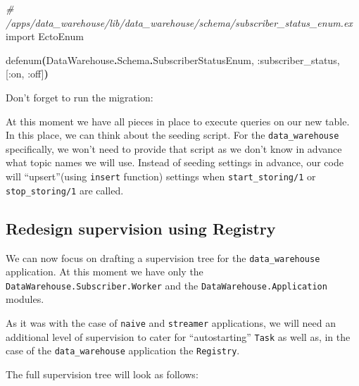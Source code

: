 \documentclass[
  oneside]{book}
\newenvironment{Shaded}{\begin{snugshade}}{\end{snugshade}}
\newcommand{\CommentTok}[1]{\textcolor[rgb]{0.56,0.35,0.01}{\textit{#1}}}
\newcommand{\ConstantTok}[1]{\textcolor[rgb]{0.56,0.35,0.01}{#1}}
\newcommand{\ExtensionTok}[1]{#1}
\newcommand{\FunctionTok}[1]{\textcolor[rgb]{0.13,0.29,0.53}{\textbf{#1}}}
\newcommand{\ImportTok}[1]{#1}
\newcommand{\NormalTok}[1]{#1}
\newcommand{\OperatorTok}[1]{\textcolor[rgb]{0.81,0.36,0.00}{\textbf{#1}}}
\newcommand{\OtherTok}[1]{\textcolor[rgb]{0.56,0.35,0.01}{#1}}
\newcommand{\VariableTok}[1]{\textcolor[rgb]{0.00,0.00,0.00}{#1}}
\begin{document}
\begin{Shaded}
\begin{Highlighting}[]
\CommentTok{\# /apps/data\_warehouse/lib/data\_warehouse/schema/subscriber\_status\_enum.ex}
\ImportTok{import} \ConstantTok{EctoEnum}

\NormalTok{defenum}\FunctionTok{(}\ConstantTok{DataWarehouse}\OperatorTok{.}\ConstantTok{Schema}\OperatorTok{.}\ConstantTok{SubscriberStatusEnum}\NormalTok{, }\VariableTok{:subscriber\_status}\NormalTok{, }\OtherTok{[}\VariableTok{:on}\NormalTok{, }\VariableTok{:off}\OtherTok{]}\FunctionTok{)}
\end{Highlighting}
\end{Shaded}

Don't forget to run the migration:

\begin{Shaded}
\end{Shaded}

At this moment we have all pieces in place to execute queries on our new table. In this place, we can think about the seeding script. For the \texttt{data\_warehouse} specifically, we won't need to provide that script as we don't know in advance what topic names we will use. Instead of seeding settings in advance, our code will ``upsert''(using \texttt{insert} function) settings when \texttt{start\_storing/1} or \texttt{stop\_storing/1} are called.

\subsection{Redesign supervision using Registry}\label{redesign-supervision-using-registry}

We can now focus on drafting a supervision tree for the \texttt{data\_warehouse} application. At this moment we have only the \texttt{DataWarehouse.Subscriber.Worker} and the \texttt{DataWarehouse.Application} modules.

As it was with the case of \texttt{naive} and \texttt{streamer} applications, we will need an additional level of supervision to cater for ``autostarting'' \texttt{Task} as well as, in the case of the \texttt{data\_warehouse} application the \texttt{Registry}.

\newpage

The full supervision tree will look as follows:
\end{document}
